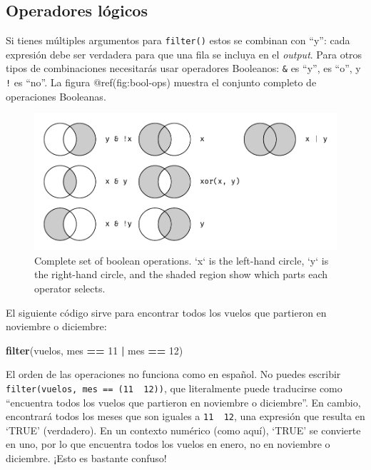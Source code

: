 \documentclass[11pt,oneside]{report}
\newenvironment{Shaded}{\begin{snugshade}}{\end{snugshade}}
\newcommand{\DecValTok}[1]{\textcolor[rgb]{0.00,0.00,0.81}{#1}}
\newcommand{\KeywordTok}[1]{\textcolor[rgb]{0.13,0.29,0.53}{\textbf{#1}}}
\newcommand{\NormalTok}[1]{#1}
\newcommand{\OperatorTok}[1]{\textcolor[rgb]{0.81,0.36,0.00}{\textbf{#1}}}
\newcommand{\StringTok}[1]{\textcolor[rgb]{0.31,0.60,0.02}{#1}}
\begin{document}
\hypertarget{operadores-luxf3gicos}{%
\subsection{Operadores lógicos}\label{operadores-luxf3gicos}}

Si tienes múltiples argumentos para \texttt{filter()} estos se combinan
con ``y'': cada expresión debe ser verdadera para que una fila se
incluya en el \emph{output}. Para otros tipos de combinaciones
necesitarás usar operadores Booleanos: \texttt{\&} es ``y'',
\texttt{\textbar{}} es ``o'', y \texttt{!} es ``no''. La figura
@ref(fig:bool-ops) muestra el conjunto completo de operaciones
Booleanas.

\begin{figure}

{\centering \includegraphics[width=0.7\linewidth]{diagrams_pdf/es/transform-logical} 

}

\caption{Complete set of boolean operations. `x` is the left-hand circle, `y` is the right-hand circle, and the shaded region show which parts each operator selects.}\label{fig:bool-ops}
\end{figure}

El siguiente código sirve para encontrar todos los vuelos que partieron
en noviembre o diciembre:

\begin{Shaded}
\begin{Highlighting}[]
\KeywordTok{filter}\NormalTok{(vuelos, mes }\OperatorTok{==}\StringTok{ }\DecValTok{11} \OperatorTok{|}\StringTok{ }\NormalTok{mes }\OperatorTok{==}\StringTok{ }\DecValTok{12}\NormalTok{)}
\end{Highlighting}
\end{Shaded}

El orden de las operaciones no funciona como en español. No puedes
escribir \texttt{filter(vuelos,\ mes\ ==\ (11\ \textbar{}\ 12))}, que
literalmente puede traducirse como ``encuentra todos los vuelos que
partieron en noviembre o diciembre''. En cambio, encontrará todos los
meses que son iguales a \texttt{11\ \textbar{}\ 12}, una expresión que
resulta en `TRUE' (verdadero). En un contexto numérico (como aquí),
`TRUE' se convierte en uno, por lo que encuentra todos los vuelos en
enero, no en noviembre o diciembre. ¡Esto es bastante confuso!
\end{document}

